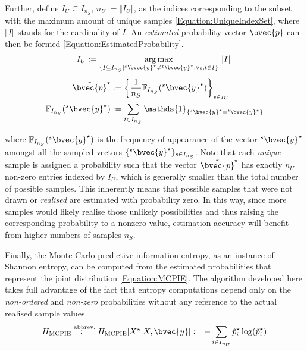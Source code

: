 			Further, define $I_{U} \subseteq I_{n_{S}}$, $n_{U} := \Vert I_{U} \Vert$, as the indices corresponding to the subset with the maximum amount of unique samples \eqref{Equation:UniqueIndexSet}, where $\Vert I \Vert$  stands for the cardinality of $I$. An \textit{estimated} probability vector $\tilde{\bvec{p}}$ can then be formed \eqref{Equation:EstimatedProbability}. \begin{equation}
				I_{U} := \argmax_{\{I \subseteq I_{n_{S}} | {^{s}}\bvec{y}^{\star} \neq {^{t}}\bvec{y}^{\star}, \forall s, t \in I\}} \Vert I \Vert 
			\label{Equation:UniqueIndexSet}
			\end{equation} \begin{equation}
				\begin{aligned}
					\tilde{\bvec{p}}^{\star} &:= \bigg\{ \frac{1}{n_{S}}\mathbb{F}_{I_{n_{S}}}({^{s}}\bvec{y}^{\star}) \bigg\}_{s \in I_{U}} \\
					\mathbb{F}_{I_{n_{S}}}({^{s}}\bvec{y}^{\star}) &:= \sum_{t \in I_{n_{S}}} \mathds{1}_{\{{^{s}}\bvec{y}^{\star} = {^{t}}\bvec{y}^{\star}\}}
				\end{aligned}
			\label{Equation:EstimatedProbability}
			\end{equation}
			
			where $\mathbb{F}_{I_{n_{S}}}({^{s}}\bvec{y}^{\star})$ is the frequency of appearance of the vector ${^{s}}\bvec{y}^{\star}$ amongst all the sampled vectors $\{ {^{s}}\bvec{y}^{\star} \}_{s \in I_{n_{S}}}$. Note that each \textit{unique} sample is assigned a probability such that the vector $\tilde{\bvec{p}}^{\star}$ has exactly $n_{U}$ non-zero entries indexed by $I_{U}$, which is generally smaller than the total number of possible samples. This inherently means that possible samples that were not drawn or \textit{realised} are estimated with probability zero. In this way, since more samples would likely realise those unlikely possibilities and thus raising the corresponding probability to a nonzero value, estimation accuracy will benefit from higher numbers of samples $n_{S}$.
			
			Finally, the Monte Carlo predictive information entropy, as an instance of Shannon entropy, can be computed from the estimated probabilities that represent the joint distribution \eqref{Equation:MCPIE}. The algorithm developed here takes full advantage of the fact that entropy computations depend only on the \textit{non-ordered} and \textit{non-zero} probabilities without any reference to the actual realised sample values. \begin{equation}
				H_{\mathrm{MCPIE}} \stackrel{\text{abbrev.}}{:=} H_{\mathrm{MCPIE}}[X^{\star} | X, \bvec{y}] := - \sum_{i \in I_{n_{U}}} \tilde{p}^{\star}_{i} \log(\tilde{p}^{\star}_{i})
			\label{Equation:MCPIE}
			\end{equation}		
			
